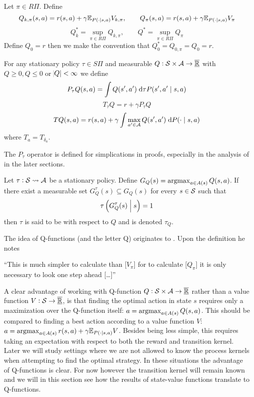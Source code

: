 \begin{defn}
  Let $\pi \in R\Pi$.
  Define
  \[ Q_{k, \pi}(s, a) = r(s, a) + \gamma \mathbb{E}_{P(\cdot \mid s, a)} V_{k, \pi}
  ,\qquad Q_\pi(s, a) = r(s, a) + \gamma \mathbb{E}_{P(\cdot \mid s, a)} V_\pi \]
  \[ Q^*_k = \sup_{\pi \in R\Pi} Q_{k, \pi}
  , \qquad Q^* = \sup_{\pi \in R\Pi} Q_\pi \]
  Define $Q_0 = r$ then we make the convention that
  $Q^*_0 = Q_{0,\pi} = Q_0 = r$.
\end{defn}
\begin{defn}
  For any stationary policy $\tau \in S\Pi$
  and measurable $Q:\mathcal{S} \times \mathcal{A} \to \overline{\underline{\mathbb{R}}}$ with
  $Q \geq 0, Q \leq 0$ or $\abs{Q} < \infty$ we define
  \[ P_\tau Q(s, a) = \int Q(s', a') \; \mathrm{d} \tau P(s', a' \mid s, a) \]
  \[ T_\tau Q = r + \gamma P_\tau Q \]
  \[ T Q(s, a) = r(s, a) + \gamma
  \int \max_{a' \in \mathcal{A}} Q(s', a') \; \mathrm{d} P(\cdot \mid s, a) \]
  where $T_a = T_{\delta_a}$.
\end{defn}
\begin{rem}
  The $P_\tau$ operator is defined for simplications in proofs, especially
  in the analysis of  in the later sections.
\end{rem}
\begin{defn}
  Let $\tau : \mathcal{S} \leadsto \mathcal{A}$ be a stationary policy. Define
  $G_Q(s) = \operatorname*{argmax}_{a \in A(s)} Q(s, a)$.
  If there exist a measurable set $G_Q^\tau(s) \subseteq G_Q(s)$
  for every $s \in \mathcal{S}$ such that
  \[ \tau \left( G_Q^\tau(s) \;\middle\vert\; s \right) = 1 \]
  then $\tau$ is said to be  with respect to $Q$ and is
  denoted $\tau_Q$.
\end{defn}

The idea of Q-functions (and the letter Q) originates to
. Upon the definition he notes
\begin{displayquote}
  ``This is much simpler to calculate than [$V_\pi$]
  for to calculate [$Q_\pi$] it is only necessary to look one
  step ahead [\ldots]''
\end{displayquote}
A clear advantage of working with Q-function
$Q:\mathcal{S}\times\mathcal{A} \to \overline{\underline{\mathbb{R}}}$ rather than a value function
$V:\mathcal{S}\to \overline{\underline{\mathbb{R}}}$,
is that finding the optimal action in state $s$
requires only a maximization over the Q-function itself:
$a = \operatorname*{argmax}_{a \in A(s)} Q(s,a)$.
This should be compared to finding a best action according to a value
function $V$:
$a = \operatorname*{argmax}_{a \in A(s)} r(s,a) + \gamma \mathbb{E}_{P(\cdot \mid s,a)} V$.
Besides being less simple,
this requires taking an expectation with respect to 
both the reward and transition kernel.
Later we will study settings where we are not allowed to know
the process kernels when attempting to find the optimal strategy.
In these situations the advantage of Q-functions is clear.
For now however the transition kernel will remain known and we
will in this section see how the results of state-value functions
translate to Q-functions.

